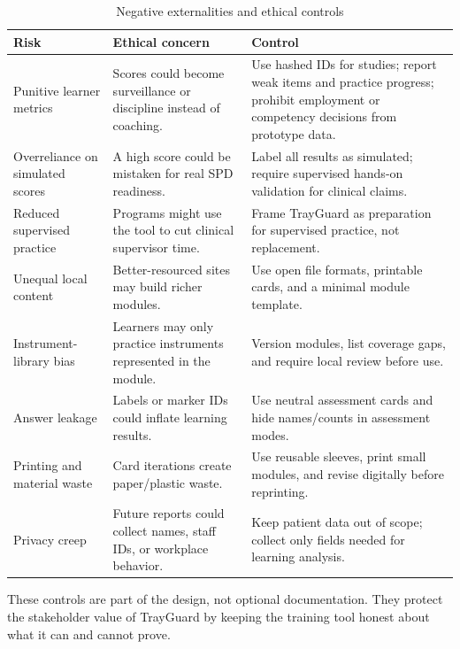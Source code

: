 \documentclass[10pt,a4paper]{article}
\begin{document}
\begin{table}[H]
\centering
\caption{Negative externalities and ethical controls}
\label{tab:negative-externalities-and-ethical-controls}
\small\renewcommand{\arraystretch}{1.2}\setlength{\tabcolsep}{4pt}
\begin{tabularx}{\textwidth}{|>{\raggedright\arraybackslash}X|>{\raggedright\arraybackslash}X|>{\raggedright\arraybackslash}X|}
\hline
Risk & Ethical concern & Control \\
\hline
Punitive learner metrics & Scores could become surveillance or discipline instead of coaching. & Use hashed IDs for studies; report weak items and practice progress; prohibit employment or competency decisions from prototype data. \\
\hline
Overreliance on simulated scores & A high score could be mistaken for real SPD readiness. & Label all results as simulated; require supervised hands-on validation for clinical claims. \\
\hline
Reduced supervised practice & Programs might use the tool to cut clinical supervisor time. & Frame TrayGuard as preparation for supervised practice, not replacement. \\
\hline
Unequal local content & Better-resourced sites may build richer modules. & Use open file formats, printable cards, and a minimal module template. \\
\hline
Instrument-library bias & Learners may only practice instruments represented in the module. & Version modules, list coverage gaps, and require local review before use. \\
\hline
Answer leakage & Labels or marker IDs could inflate learning results. & Use neutral assessment cards and hide names/counts in assessment modes. \\
\hline
Printing and material waste & Card iterations create paper/plastic waste. & Use reusable sleeves, print small modules, and revise digitally before reprinting. \\
\hline
Privacy creep & Future reports could collect names, staff IDs, or workplace behavior. & Keep patient data out of scope; collect only fields needed for learning analysis. \\
\hline
\end{tabularx}
\end{table}
These controls are part of the design, not optional documentation. They protect
the stakeholder value of TrayGuard by keeping the training tool honest about
what it can and cannot prove.
\end{document}
